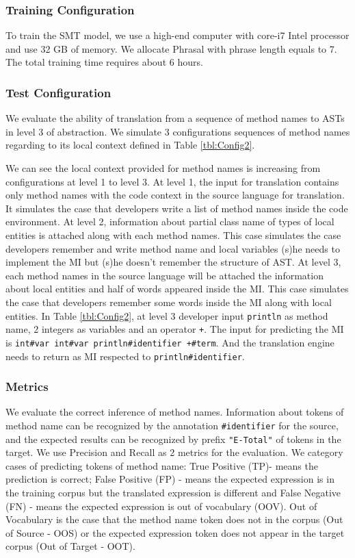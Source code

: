 \subsubsection{Training Configuration} To train the SMT model, we use a high-end computer with core-i7 Intel processor and use 32 GB of memory. We allocate Phrasal with phrase length equals to 7. The total training time requires about 6 hours.

\subsubsection{Test Configuration}
We evaluate the ability of translation from a sequence of method names to ASTs in level 3 of abstraction. We simulate 3 configurations sequences of method names regarding to its local context defined in Table \ref{tbl:Config2}. 



We can see the local context provided for method names is increasing from configurations at level 1 to level 3. At level 1, the input for translation contains only method names with the code context in the source language for translation. It simulates the case that developers write a list of method names inside the code environment. At level 2, information about partial class name of types of local entities is attached along with each method names. This case simulates the case developers remember and write method name and local variables (s)he needs to implement the MI but (s)he doesn't remember the structure of AST. At level 3, each method names in the source language will be attached the information about local entities and half of words appeared inside the MI. This case simulates the case that developers remember some words inside the MI along with local entities. In Table \ref{tbl:Config2}, at level 3 developer input \texttt{println} as method name, 2 integers as variables and an operator \texttt{+}. The input for predicting the MI is \texttt{int\#var int\#var println\#identifier +\#term}. And the translation engine needs to return as MI respected to \texttt{println\#identifier}.

\subsubsection{Metrics}
We evaluate the correct inference of method names. Information about tokens of method name can be recognized by the annotation \texttt{\#identifier} for the source, and the expected results can be recognized by prefix \texttt{"E-Total"} of tokens in the target. We use Precision and Recall as 2 metrics for the evaluation. We category cases of predicting tokens of method name: True Positive (TP)- means the prediction is correct; False Positive (FP) - means the expected expression is in the training corpus but the translated expression is different and False Negative (FN) - means the expected expression is out of vocabulary (OOV). Out of Vocabulary is the case that the method name token does not in the corpus (Out of Source - OOS) or the expected expression token does not appear in the target corpus (Out of Target - OOT). 
 
